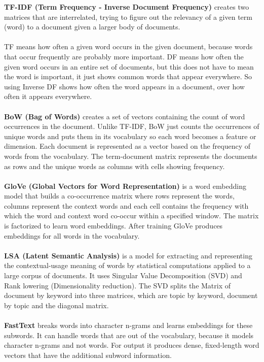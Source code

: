 \documentclass[10pt, oneside,english,hidelinks,a4paper]{article}
\begin{document}
\begin{multicols}{2}
\textbf{TF-IDF (Term Frequency - Inverse Document Frequency)} creates two matrices that are interrelated, trying to figure out the relevancy of a given term (word) to a document given a larger body of documents.\\\\
TF means how often a given word occurs in the given document, because words that occur frequently are probably more important. DF means how often the given word occurs in an entire set of documents, but this does not have to mean the word is important, it just shows common words that appear everywhere. So using Inverse DF shows how often the word appears in a document, over how often it appears everywhere.\\\\
\textbf{BoW (Bag of Words)} creates a set of vectors containing the count of word occurrences in the document. Unlike TF-IDF, BoW just counts the occurrences of unique words and puts them in its vocabulary so each word becomes a feature or dimension. Each document is represented as a vector based on the frequency of words from the vocabulary. The term-document matrix represents the documents as rows and the unique words as columns with cells showing frequency.\\\\
\textbf{GloVe (Global Vectors for Word Representation)} is a word embedding model that builds a co-occurrence matrix where rows represent the words, columns represent the context words and each cell contains the frequency with which the word and context word co-occur within a specified window. The matrix is factorized to learn word embeddings. After training GloVe produces embeddings for all words in the vocabulary.\\\\
\textbf{LSA (Latent Semantic Analysis)} is a model for extracting and representing the contextual-usage meaning of words by statistical computations applied to a large corpus of documents. It uses Singular Value Decomposition (SVD) and Rank lowering (Dimensionality reduction). The SVD splits the Matrix of document by keyword into three matrices, which are topic by keyword, document by topic and the diagonal matrix.\\\\
\textbf{FastText} breaks words into character n-grams and learns embeddings for these subwords. It can handle words that are out of the vocabulary, because it models character n-grams and not words. For output it produces dense, fixed-length word vectors that have the additional subword information.\\



\end{multicols}
\end{document}
